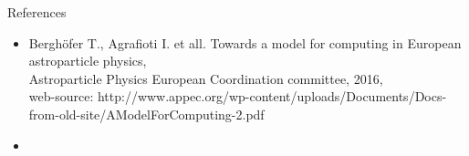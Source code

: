 \documentclass[18pt]{beamer}
\begin{document}
\begin{frame}{References}
  \begin{itemize}
   \item Berghöfer T., Agrafioti I. et all. Towards a model for computing in European astroparticle physics,\\ 
   Astroparticle Physics European Coordination committee, 2016, \\
   web-source: http://www.appec.org/wp-content/uploads/Documents/Docs-from-old-site/AModelForComputing-2.pdf
   \item 
   
  \end{itemize}

\end{frame}



\backupend
\end{document}
